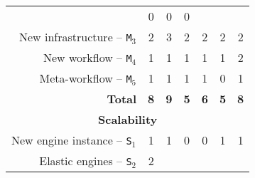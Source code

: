 \documentclass[preprint,3p,twocolumn]{elsarticle}
\begin{document}
\begin{table*}
\begin{tabular}{rcccccc}
                                     & \cellcolor[HTML]{99FF99}0
                                     & \cellcolor[HTML]{99FF99}0
                                     & \cellcolor[HTML]{99FF99}0 \\
New infrastructure -- \texttt{M$_3$} & \cellcolor[HTML]{99FF99}2
                                     & \cellcolor[HTML]{99FF99}3
                                     & \cellcolor[HTML]{99FF99}2
                                     & \cellcolor[HTML]{99FF99}2
                                     & \cellcolor[HTML]{99FF99}2
                                     & \cellcolor[HTML]{99FF99}2 \\
New workflow -- \texttt{M$_4$}       & \cellcolor[HTML]{99FF99}1
                                     & \cellcolor[HTML]{99FF99}1
                                     & \cellcolor[HTML]{99FF99}1
                                     & \cellcolor[HTML]{99FF99}1
                                     & \cellcolor[HTML]{99FF99}1
                                     & \cellcolor[HTML]{99AA99}2 \\
Meta-workflow  -- \texttt{M$_5$}     & \cellcolor[HTML]{99AA99}1
                                     & \cellcolor[HTML]{99AA99}1  
                                     & \cellcolor[HTML]{99AA99}1
                                     & \cellcolor[HTML]{99AA99}1
                                     & \cellcolor[HTML]{99FF99}0
                                     & \cellcolor[HTML]{99AA99}1 \\
\textbf{Total}                       & \cellcolor[HTML]{99AA99}\textbf{8}
                                     & \cellcolor[HTML]{99EE99}\textbf{9}
                                     & \cellcolor[HTML]{99FF99}\textbf{5}
                                     & \cellcolor[HTML]{99EE99}\textbf{6}
                                     & \cellcolor[HTML]{99FF99}\textbf{5}
                                     & \cellcolor[HTML]{99AA99}\textbf{8} \\
\multicolumn{7}{c}{\cellcolor[HTML]{EEEEEE}\textbf{Scalability}}\\
New engine instance -- \texttt{S$_1$}& \cellcolor[HTML]{99AA99}1
                                     & \cellcolor[HTML]{99AA99}1
                                     & \cellcolor[HTML]{99FF99}0
                                     & \cellcolor[HTML]{99FF99}0
                                     & \cellcolor[HTML]{99AA99}1
                                     & \cellcolor[HTML]{99AA99}1 \\
Elastic engines -- \texttt{S$_2$}    & \cellcolor[HTML]{99AA99}2

\end{tabular}
\end{table*}
\end{document}
